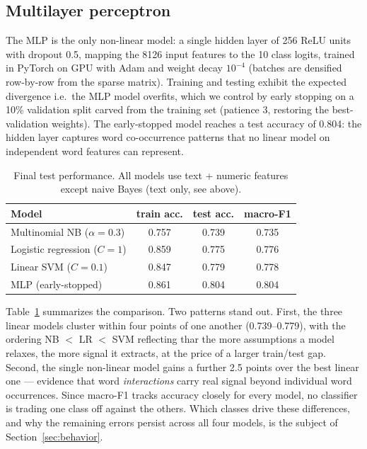 \documentclass[11pt,a4paper]{article}
\begin{document}
\subsection{Multilayer perceptron}
The MLP is the only non-linear model: a single hidden layer of 256 ReLU
units with dropout 0.5, mapping the 8126 input features to the 10 class
logits, trained in PyTorch on GPU with Adam and weight decay $10^{-4}$
(batches are densified row-by-row from the sparse matrix). Training and testing exhibit the expected divergence i.e.\ the MLP model overfits, which we control by early stopping on a 10\% validation split carved from the training set
(patience 3, restoring the best-validation weights). The early-stopped
model reaches a test accuracy of 0.804: the hidden layer captures word
co-occurrence patterns that no linear model on independent word features
can represent.
 
\begin{table}[htbp]\centering\small
\caption{Final test performance. All models use text + numeric features
except naive Bayes (text only, see above).}
\label{tab:results}
\begin{tabular}{lccc}\toprule
Model & train acc. & test acc. & macro-F1\\\midrule
Multinomial NB ($\alpha=0.3$) & 0.757 & 0.739 & 0.735\\
Logistic regression ($C=1$)   & 0.859 & 0.775 & 0.776\\
Linear SVM ($C=0.1$)          & 0.847 & 0.779 & 0.778\\
MLP (early-stopped)           & 0.861 & 0.804 & 0.804\\
\bottomrule
\end{tabular}
\end{table}
 
Table~\ref{tab:results} summarizes the comparison. Two patterns stand out.
First, the three linear models cluster within four points of one another
(0.739--0.779), with the ordering NB $<$ LR $<$ SVM reflecting thar the more assumptions a model relaxes, the more signal it extracts, at the price of a larger train/test gap. Second, the single non-linear model gains a further 2.5 points over the best linear one --- evidence that word \emph{interactions} carry real signal beyond individual word occurrences. Since macro-F1 tracks accuracy closely for
every model, no classifier is trading one class off against the others.
Which classes drive these differences, and why the remaining errors
persist across all four models, is the subject of Section~\ref{sec:behavior}.
\end{document}
